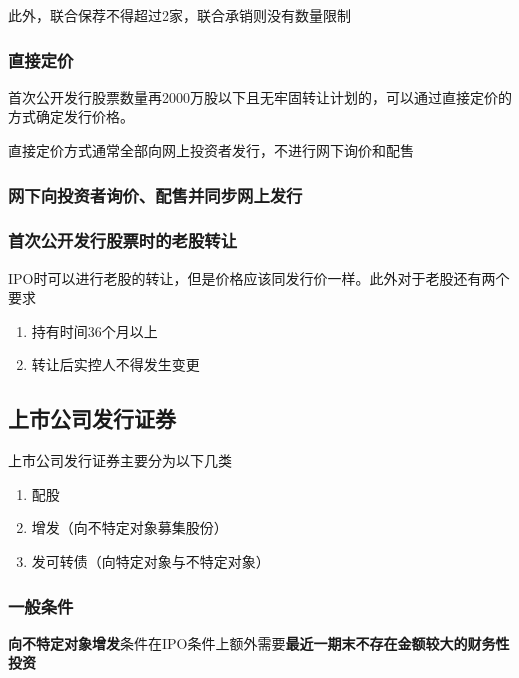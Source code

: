 \documentclass[UTF8,12pt]{ctexart}
\numberwithin{equation}{section} %
\numberwithin{figure}{section}
\numberwithin{table}{section}
\begin{document}
	此外，联合保荐不得超过2家，联合承销则没有数量限制
	
	\subsubsection{直接定价}
	首次公开发行股票数量再2000万股以下且无牢固转让计划的，可以通过直接定价的方式确定发行价格。
	
	直接定价方式通常全部向网上投资者发行，不进行网下询价和配售	
	
	
	
	\subsubsection{网下向投资者询价、配售并同步网上发行}
	
	\subsubsection{首次公开发行股票时的老股转让}
	IPO时可以进行老股的转让，但是价格应该同发行价一样。此外对于老股还有两个要求
	\begin{enumerate}
		\item 持有时间36个月以上
		
		\item 转让后实控人不得发生变更
	\end{enumerate}	
	
	
	
	
	
	\subsection{上市公司发行证券}
	上市公司发行证券主要分为以下几类
	\begin{enumerate}
		\item 配股
		
		\item 增发（向不特定对象募集股份）
		
		\item 发可转债（向特定对象与不特定对象）
	\end{enumerate}
	
	\subsubsection{一般条件}
	
	\textbf{向不特定对象增发}条件在IPO条件上额外需要\textbf{最近一期末不存在金额较大的财务性投资}
	
\end{document}
